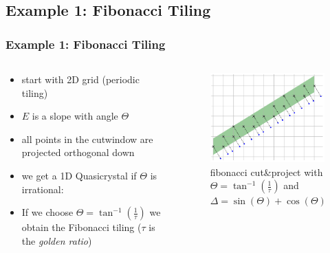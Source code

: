 \documentclass[]{beamer}
\begin{document}
\begin{frame}
  \subsection{Example 1: Fibonacci Tiling}
  \frametitle{Example 1: Fibonacci Tiling}
  \begin{columns} 
        \begin{column}{.5\textwidth}
          \begin{itemize}
            \item start with 2D grid (periodic tiling)
            \item $E$ is a slope with angle $\Theta$
            \item all points in the cutwindow are projected orthogonal down
            \item we get a 1D Quasicrystal if $\Theta$ is irrational:
            \item If we choose $\Theta=\tan^{-1}(\frac{1}{\tau})$ we obtain the Fibonacci tiling ($\tau$ is the \textit{golden ratio})
          \end{itemize}
        \end{column}
        \begin{column}{.5\textwidth}
          \begin{figure}
            \centering
              \includegraphics[width=\textwidth]{assets/fibonacci1D.png}
              \caption{fibonacci cut\&project with $\Theta=\tan^{-1}(\frac{1}{\tau})$ and $\Delta=\sin(\Theta)+\cos(\Theta)$}
              \label{fig:fibonacci1D}
            \end{figure}
        \end{column}%
        
    \end{columns}
\end{frame}
\end{document}
